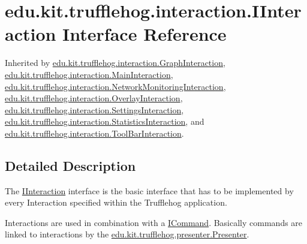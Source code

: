 \hypertarget{interfaceedu_1_1kit_1_1trufflehog_1_1interaction_1_1_i_interaction}{}\section{edu.\+kit.\+trufflehog.\+interaction.\+I\+Interaction Interface Reference}
\label{interfaceedu_1_1kit_1_1trufflehog_1_1interaction_1_1_i_interaction}


Inherited by \hyperlink{enumedu_1_1kit_1_1trufflehog_1_1interaction_1_1_graph_interaction}{edu.\+kit.\+trufflehog.\+interaction.\+Graph\+Interaction}, \hyperlink{enumedu_1_1kit_1_1trufflehog_1_1interaction_1_1_main_interaction}{edu.\+kit.\+trufflehog.\+interaction.\+Main\+Interaction}, \hyperlink{enumedu_1_1kit_1_1trufflehog_1_1interaction_1_1_network_monitoring_interaction}{edu.\+kit.\+trufflehog.\+interaction.\+Network\+Monitoring\+Interaction}, \hyperlink{enumedu_1_1kit_1_1trufflehog_1_1interaction_1_1_overlay_interaction}{edu.\+kit.\+trufflehog.\+interaction.\+Overlay\+Interaction}, \hyperlink{enumedu_1_1kit_1_1trufflehog_1_1interaction_1_1_settings_interaction}{edu.\+kit.\+trufflehog.\+interaction.\+Settings\+Interaction}, \hyperlink{enumedu_1_1kit_1_1trufflehog_1_1interaction_1_1_statistics_interaction}{edu.\+kit.\+trufflehog.\+interaction.\+Statistics\+Interaction}, and \hyperlink{enumedu_1_1kit_1_1trufflehog_1_1interaction_1_1_tool_bar_interaction}{edu.\+kit.\+trufflehog.\+interaction.\+Tool\+Bar\+Interaction}.



\subsection{Detailed Description}
The \hyperlink{interfaceedu_1_1kit_1_1trufflehog_1_1interaction_1_1_i_interaction}{I\+Interaction} interface is the basic interface that has to be implemented by every Interaction specified within the Trufflehog application. 

Interactions are used in combination with a \hyperlink{}{I\+Command}. Basically commands are linked to interactions by the \hyperlink{classedu_1_1kit_1_1trufflehog_1_1presenter_1_1_presenter}{edu.\+kit.\+trufflehog.\+presenter.\+Presenter}. 